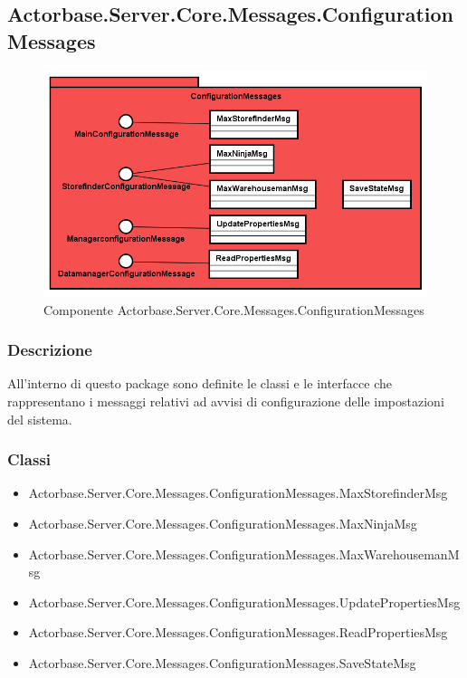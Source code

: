 \documentclass[a4paper]{article}
\begin{document}
			\subsection{Actorbase.Server.Core.Messages.ConfigurationMessages}
			\begin{figure} [H]
			\centering
			\includegraphics[scale=0.55]{Server/Package/ConfigurationMessagesLevel.png}
			\caption{Componente Actorbase.Server.Core.Messages.ConfigurationMessages}
			\end{figure}
			\subsubsection{Descrizione}
				All'interno di questo package sono definite le classi e le interfacce che rappresentano i messaggi relativi ad avvisi di configurazione delle impostazioni del sistema.
			\subsubsection{Classi}
			\begin{itemize}
				\item Actorbase.Server.Core.Messages.ConfigurationMessages.MaxStorefinderMsg
				\item Actorbase.Server.Core.Messages.ConfigurationMessages.MaxNinjaMsg
				\item Actorbase.Server.Core.Messages.ConfigurationMessages.MaxWarehousemanMsg
				\item Actorbase.Server.Core.Messages.ConfigurationMessages.UpdatePropertiesMsg
				\item Actorbase.Server.Core.Messages.ConfigurationMessages.ReadPropertiesMsg
				\item Actorbase.Server.Core.Messages.ConfigurationMessages.SaveStateMsg
			\end{itemize}
\end{document}
